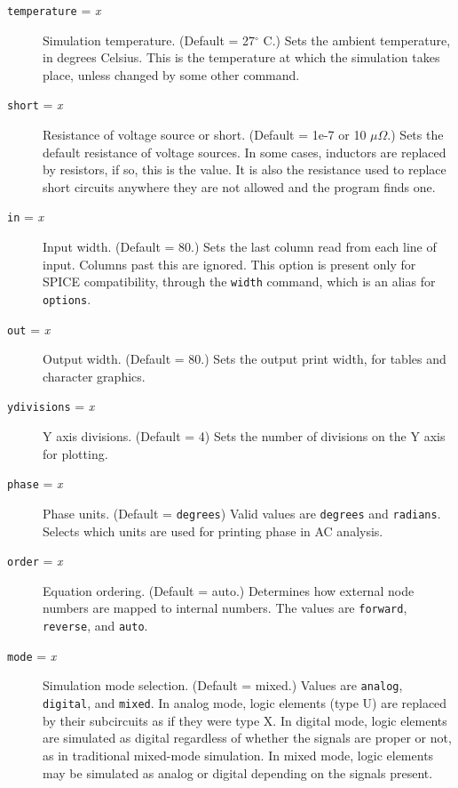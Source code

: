 \begin{description}
\item[{\tt temperature} = {\it x}] Simulation temperature.
(Default = 27$^{\circ}$ C.)  Sets the ambient temperature, in
degrees Celsius.  This is the temperature at which the
simulation takes place, unless changed by some other command.

\item[{\tt short} = {\it x}] Resistance of voltage source or
short.  (Default = 1e-7 or 10 $\mu\Omega$.)  Sets the default
resistance of voltage sources.  In some cases, inductors are
replaced by resistors, if so, this is the value.  It is also
the resistance used to replace short circuits anywhere they are
not allowed and the program finds one.

\item[{\tt in} = {\it x}] Input width.  (Default = 80.)
Sets the last column read from each line of input.  Columns
past this are ignored.  This option is present only for SPICE
compatibility, through the {\tt width} command, which is an
alias for {\tt options}.

\item[{\tt out} = {\it x}] Output width.  (Default = 80.)
Sets the output print width, for tables and character graphics.

\item[{\tt ydivisions} = {\it x}]  Y axis divisions. (Default = 4)
Sets the number of divisions on the Y axis for plotting.

\item[{\tt phase} = {\it x}]
Phase units. (Default = {\tt degrees}) Valid values are {\tt degrees}
and {\tt radians}.  Selects which units are used for printing phase in
AC analysis.

\item[{\tt order} = {\it x}] Equation ordering.  (Default = auto.)
Determines how external node numbers are mapped to internal numbers.  The
values are {\tt forward}, {\tt reverse}, and {\tt auto}.

\item[{\tt mode} = {\it x}] Simulation mode selection.  (Default = mixed.)
Values are {\tt analog}, {\tt digital}, and {\tt mixed}.  In analog mode,
logic elements (type U) are replaced by their subcircuits as if they were
type X.  In digital mode, logic elements are simulated as digital regardless
of whether the signals are proper or not, as in traditional mixed-mode
simulation.  In mixed mode, logic elements may be simulated as analog or
digital depending on the signals present.


\end{description}

